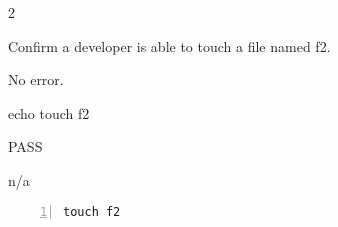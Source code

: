\begin{description}[align=right,leftmargin=3.2cm,labelindent=3.0cm]
\item[Step:] 2
\item[Confirm:] Confirm a developer is able to touch a file named f2.
\item[Expectation:] No error.
\item[Command:] echo touch  f2
\item[Test Result:] PASS
\item[Evidence:] n/a
\end{description}
\begin{lstlisting}[numbers=left]
touch f2

\end{lstlisting}
